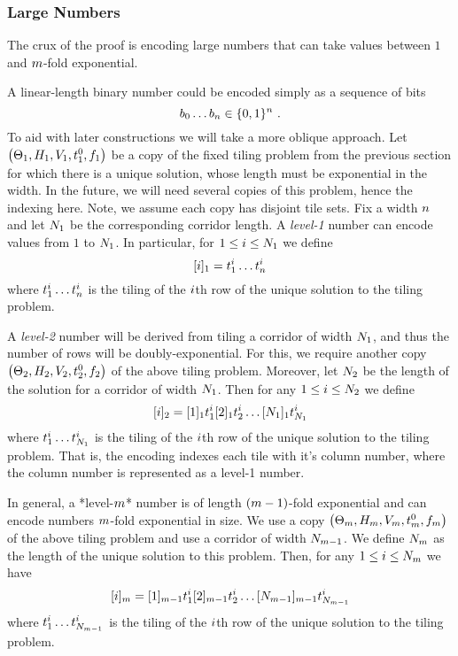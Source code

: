 \subsubsection{Large Numbers}

The crux of the proof is encoding large numbers that can take values
between $1$ and $\expheight$-fold exponential.

A linear-length binary number could be encoded simply as a sequence of bits
\[
    b_0 \ldots b_\linlen \in \set{0,1}^\linlen \ .
\]
To aid with later constructions we will take a more oblique approach.
Let
$\tup{\tilesnum{1}, \hrelnum{1}, \vrelnum{1}, \inittilenum{1}, \fintilenum{1}}$
be a copy of the fixed tiling problem from the previous section for
which there is a unique solution, whose length must be exponential in
the width. In the future, we will need several copies of this problem,
hence the indexing here. Note, we assume each copy has disjoint tile
sets. Fix a width $\linlen$ and let $\nmax{1}$ be the corresponding
corridor length. A \emph{level-1} number can encode values from $1$ to
$\nmax{1}$. In particular, for $1 \leq \idxi \leq \nmax{1}$ we define
\[
    \tenc{1}{\idxi} = \tile^\idxi_1 \ldots \tile^\idxi_\linlen
\]
where
$\tile^\idxi_1 \ldots \tile^\idxi_\linlen$
is the tiling of the $\idxi$th row of the unique solution to the tiling problem.

A \emph{level-2} number will be derived from tiling a corridor of width
$\nmax{1}$, and thus the number of rows will be doubly-exponential. For
this, we require another copy $\tup{\tilesnum{2}, \hrelnum{2},
\vrelnum{2}, \inittilenum{2}, \fintilenum{2}}$ of the above tiling
problem. Moreover, let $\nmax{2}$ be the length of the solution for a
corridor of width $\nmax{1}$. Then for any $1 \leq \idxi \leq \nmax{2}$ we
define
\[
    \tenc{2}{\idxi} =
        \tenc{1}{1} \tile^\idxi_1
        \tenc{1}{2} \tile^\idxi_2
        \ldots
        \tenc{1}{\nmax{1}} \tile^\idxi_{\nmax{1}}
\]
where
$\tile^\idxi_1 \ldots \tile^\idxi_{\nmax{1}}$
is the tiling of the $\idxi$th row of the unique solution to the tiling
problem. That is, the encoding indexes each tile with it's column
number, where the column number is represented as a level-1 number.

In general, a *level-$\expheight$* number is of length
$(\expheight-1)$-fold exponential and can encode numbers
$\expheight$-fold exponential in size. We use a copy
$\tup{\tilesnum{\expheight},
      \hrelnum{\expheight},
      \vrelnum{\expheight},
      \inittilenum{\expheight},
      \fintilenum{\expheight}}$
of the above tiling problem and use a corridor of width
$\nmax{\expheight-1}$. We define $\nmax{\expheight}$ as the length of
the unique solution to this problem. Then, for any $1 \leq \idxi \leq
\nmax{\expheight}$ we have
\[
    \tenc{\expheight}{\idxi} =
        \tenc{\expheight-1}{1} \tile^\idxi_1
        \tenc{\expheight-1}{2} \tile^\idxi_2
        \ldots
        \tenc{\expheight-1}{\nmax{\expheight-1}}
            \tile^\idxi_{\nmax{\expheight-1}}
\]
where
$\tile^\idxi_1 \ldots \tile^\idxi_{\nmax{\expheight-1}}$
is the tiling of the $\idxi$th row of the unique solution to the tiling problem.

